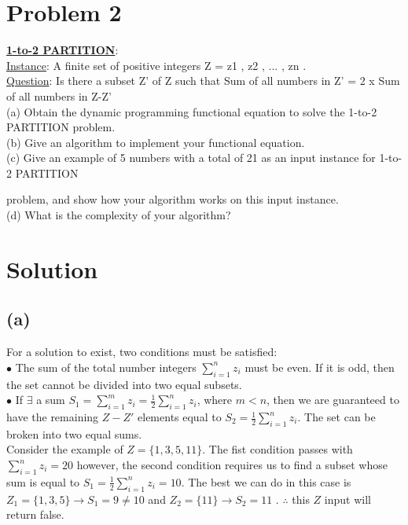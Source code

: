 
\section*{Problem 2}
    \textbf{\underline{1-to-2 PARTITION}}:\\
    \underline{Instance}: A finite set of positive integers Z = { z1 , z2 , ... , zn }.\\
    \underline{Question}: Is there a subset Z' of Z such that
    Sum of all numbers in Z' = 2 x Sum of all numbers in Z-Z'\\
    
    \noindent
    (a) Obtain the dynamic programming functional equation to solve the 1-to-2 PARTITION problem.\\
    (b) Give an algorithm to implement your functional equation.\\
    (c) Give an example of 5 numbers with a total of 21 as an input instance for 1-to-2 PARTITION
    
     problem, and show how your algorithm works on this input instance.\\
    (d) What is the complexity of your algorithm?\\

\section*{Solution}
	\subsection*{(a)}
		For a solution to exist, two conditions must be satisfied:\\
		$\bullet$ The sum of the total number integers $\sum_{i=1}^{n} z_i$ must be even. If it is odd, then the set cannot be divided into two equal subsets. \\
		$\bullet$ If $\exists$ a sum $S_1 = \sum_{i=1}^{m} z_i = \frac{1}{2}\sum_{i=1}^{n} z_i $, where $m < n$, then we are guaranteed to have the remaining $Z-Z'$ elements equal to $S_2 = \frac{1}{2}\sum_{i=1}^{n} z_i$. The set can be broken into two equal sums.\\
		
		\noindent
		Consider the example of $Z = \{1,3,5,11\}$. The fist condition passes with $\sum_{i=1}^{n} z_i = 20$  however, the second condition requires us to find a subset whose sum is equal to $S_1 = \frac{1}{2}\sum_{i=1}^{n} z_i = 10$. The best we can do in this case is $Z_1 = \{1,3,5\}\rightarrow S_1 = 9\neq 10$ and $Z_2 = \{11\}\rightarrow S_2 = 11$ . $\therefore$ this $Z$ input will return false.\\
		
